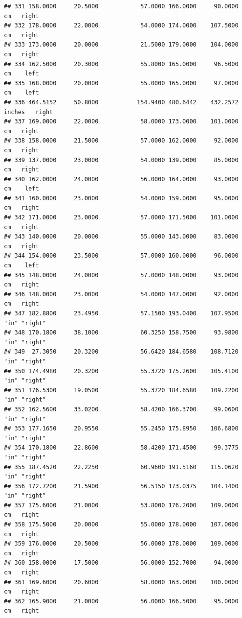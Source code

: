 \documentclass[]{article}
\begin{document}
\begin{verbatim}
## 331 158.0000     20.5000            57.0000 166.0000     90.0000     cm   right
## 332 178.0000     22.0000            54.0000 174.0000    107.5000     cm   right
## 333 173.0000     20.0000            21.5000 179.0000    104.0000     cm   right
## 334 162.5000     20.3000            55.8000 165.0000     96.5000     cm    left
## 335 168.0000     20.0000            55.0000 165.0000     97.0000     cm    left
## 336 464.5152     50.8000           154.9400 480.6442    432.2572 inches   right
## 337 169.0000     22.0000            58.0000 173.0000    101.0000     cm   right
## 338 158.0000     21.5000            57.0000 162.0000     92.0000     cm   right
## 339 137.0000     23.0000            54.0000 139.0000     85.0000     cm   right
## 340 162.0000     24.0000            56.0000 164.0000     93.0000     cm    left
## 341 160.0000     23.0000            54.0000 159.0000     95.0000     cm   right
## 342 171.0000     23.0000            57.0000 171.5000    101.0000     cm   right
## 343 140.0000     20.0000            55.0000 143.0000     83.0000     cm   right
## 344 154.0000     23.5000            57.0000 160.0000     96.0000     cm    left
## 345 148.0000     24.0000            57.0000 148.0000     93.0000     cm   right
## 346 148.0000     23.0000            54.0000 147.0000     92.0000     cm   right
## 347 182.8800     23.4950            57.1500 193.0400    107.9500   "in" "right"
## 348 170.1800     38.1000            60.3250 158.7500     93.9800   "in" "right"
## 349  27.3050     20.3200            56.6420 184.6580    108.7120   "in" "right"
## 350 174.4980     20.3200            55.3720 175.2600    105.4100   "in" "right"
## 351 176.5300     19.0500            55.3720 184.6580    109.2200   "in" "right"
## 352 162.5600     33.0200            58.4200 166.3700     99.0600   "in" "right"
## 353 177.1650     20.9550            55.2450 175.8950    106.6800   "in" "right"
## 354 170.1800     22.8600            58.4200 171.4500     99.3775   "in" "right"
## 355 187.4520     22.2250            60.9600 191.5160    115.0620   "in" "right"
## 356 172.7200     21.5900            56.5150 173.0375    104.1400   "in" "right"
## 357 175.6000     21.0000            53.8000 176.2000    109.0000     cm   right
## 358 175.5000     20.0000            55.0000 178.0000    107.0000     cm   right
## 359 176.0000     20.5000            56.0000 178.0000    109.0000     cm   right
## 360 158.0000     17.5000            56.0000 152.7000     94.0000     cm   right
## 361 169.6000     20.6000            58.0000 163.0000    100.0000     cm   right
## 362 165.9000     21.0000            56.0000 166.5000     95.0000     cm   right

\end{verbatim}
\end{document}
